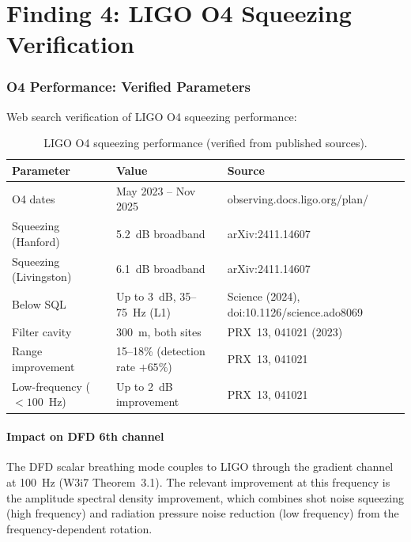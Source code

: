 \documentclass[11pt]{article}
\theoremstyle{definition}
\theoremstyle{remark}
\begin{document}
\part{Finding 4: LIGO O4 Squeezing Verification}
\label{part:ligo}

\section{O4 Performance: Verified Parameters}
\label{sec:o4_params}

Web search verification of LIGO O4 squeezing performance:

\begin{table}[H]
\centering
\caption{LIGO O4 squeezing performance (verified from published sources).}
\label{tab:ligo_o4}
\renewcommand{\arraystretch}{1.3}
\begin{tabular}{@{}p{4cm}p{3cm}p{5cm}@{}}
\toprule
\textbf{Parameter} & \textbf{Value} & \textbf{Source} \\
\midrule
O4 dates & May 2023 -- Nov 2025 &
  observing.docs.ligo.org/plan/ \\
Squeezing (Hanford) & 5.2~dB broadband &
  arXiv:2411.14607 \\
Squeezing (Livingston) & 6.1~dB broadband &
  arXiv:2411.14607 \\
Below SQL & Up to 3~dB, 35--75~Hz (L1) &
  Science (2024), doi:10.1126/science.ado8069 \\
Filter cavity & 300~m, both sites &
  PRX~13, 041021 (2023) \\
Range improvement & 15--18\% (detection rate $+65\%$) &
  PRX~13, 041021 \\
Low-frequency ($<100$~Hz) & Up to 2~dB improvement &
  PRX~13, 041021 \\
\bottomrule
\end{tabular}
\end{table}

\subsection{Impact on DFD 6th channel}

The DFD scalar breathing mode couples to LIGO through the gradient
channel at 100~Hz (W3i7 Theorem~3.1). The relevant improvement at
this frequency is the amplitude spectral density improvement, which
combines shot noise squeezing (high frequency) and radiation pressure
noise reduction (low frequency) from the frequency-dependent rotation.
\end{document}

